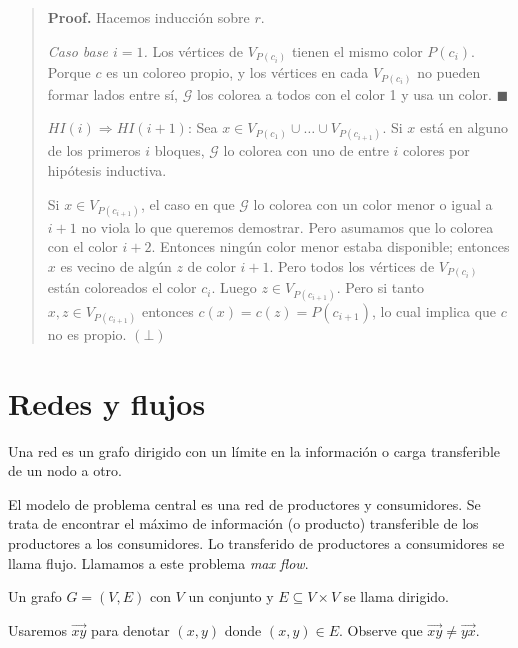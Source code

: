 \documentclass[a4paper]{article}
\begin{document}
\small
\begin{quote}

\textbf{Proof.} Hacemos inducción sobre $r$. 

\textit{Caso base $i = 1$.} Los vértices de $V_{P(c_i)}$ tienen el mismo color $P(c_i)$.
Porque $c$ es un coloreo propio, y los vértices en cada $V_{P(c_i)}$ no pueden
formar lados entre sí, $\mathscr{G}$ los colorea a todos con el color 1 y usa un color.
$\blacksquare$


$HI(i) \Rightarrow HI(i+1)$: Sea $x \in V_{P(c_1)} \cup  \ldots \cup
V_{P(c_{i+1})}$. Si $x$ está en alguno de los primeros $i$ bloques, $\mathscr{G}$ lo
colorea con uno de entre $i$ colores por hipótesis inductiva. 

Si $x \in V_{P(c_{i+1})}$, el
caso en que $\mathscr{G}$ lo colorea con un color menor o igual a $i + 1$ no viola lo
que queremos demostrar. Pero asumamos que lo colorea con el color $i +
2$. Entonces ningún color menor estaba disponible; entonces $x$ es vecino de
algún $z$ de color $i + 1$. Pero todos los vértices de $V_{P(c_{i})}$ están
coloreados el color $c_i$. Luego $z \in V_{P(c_{i+1})}$. Pero si
tanto $x, z \in V_{P(c_{i+1})}$ entonces $c(x) = c(z) = P(c_{i+1})$, lo cual
implica que $c$ no es propio. $(\bot)$

\end{quote}
\normalsize

\pagebreak 

\section{Redes y flujos}

Una red es un grafo dirigido con un límite en la información o carga
transferible de un nodo a otro. 

El modelo de problema central es una red de productores y
consumidores. Se trata de encontrar el máximo de información (o producto)
transferible de los productores a los consumidores. Lo transferido de
productores a consumidores se llama flujo. Llamamos a este problema \textit{max
flow}.

\begin{definition}
    Un grafo $G = (V, E) $ con $V$ un conjunto y $E \subseteq V \times V$ se
    llama dirigido.
\end{definition}

Usaremos $\overrightarrow{xy}$ para denotar $(x, y)$ donde $(x, y) \in E$. Observe que
$\overrightarrow{xy} \neq \overrightarrow{yx}$.
\end{document}
